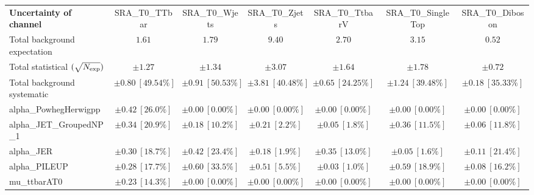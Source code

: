 
\begin{sidewaystable}
\begin{center}
\setlength{\tabcolsep}{0.0pc}
\begin{tabular*}{\textwidth}{@{\extracolsep{\fill}}lcccccc}
\noalign{\smallskip}\hline\noalign{\smallskip}
{\bf Uncertainty of channel}                                    & SRA\_T0\_TTbar            & SRA\_T0\_Wjets            & SRA\_T0\_Zjets            & SRA\_T0\_TtbarV            & SRA\_T0\_SingleTop            & SRA\_T0\_Diboson            \\
\noalign{\smallskip}\hline\noalign{\smallskip}
Total background expectation             &  $1.61$        &  $1.79$        &  $9.40$        &  $2.70$        &  $3.15$        &  $0.52$       \\
\noalign{\smallskip}\hline\noalign{\smallskip}
Total statistical $(\sqrt{N_{\rm exp}})$              & $\pm 1.27$        & $\pm 1.34$        & $\pm 3.07$        & $\pm 1.64$        & $\pm 1.78$        & $\pm 0.72$       \\
Total background systematic               & $\pm 0.80\ [49.54\%] $        & $\pm 0.91\ [50.53\%] $        & $\pm 3.81\ [40.48\%] $        & $\pm 0.65\ [24.25\%] $        & $\pm 1.24\ [39.48\%] $        & $\pm 0.18\ [35.33\%] $             \\
\noalign{\smallskip}\hline\noalign{\smallskip}
\noalign{\smallskip}\hline\noalign{\smallskip}
alpha\_PowhegHerwigpp         & $\pm 0.42\ [26.0\%] $          & $\pm 0.00\ [0.00\%] $          & $\pm 0.00\ [0.00\%] $          & $\pm 0.00\ [0.00\%] $          & $\pm 0.00\ [0.00\%] $          & $\pm 0.00\ [0.00\%] $       \\
alpha\_JET\_GroupedNP\_1         & $\pm 0.34\ [20.9\%] $          & $\pm 0.18\ [10.2\%] $          & $\pm 0.21\ [2.2\%] $          & $\pm 0.05\ [1.8\%] $          & $\pm 0.36\ [11.5\%] $          & $\pm 0.06\ [11.8\%] $       \\
alpha\_JER         & $\pm 0.30\ [18.7\%] $          & $\pm 0.42\ [23.4\%] $          & $\pm 0.18\ [1.9\%] $          & $\pm 0.35\ [13.0\%] $          & $\pm 0.05\ [1.6\%] $          & $\pm 0.11\ [21.4\%] $       \\
alpha\_PILEUP         & $\pm 0.28\ [17.7\%] $          & $\pm 0.60\ [33.5\%] $          & $\pm 0.51\ [5.5\%] $          & $\pm 0.03\ [1.0\%] $          & $\pm 0.59\ [18.9\%] $          & $\pm 0.08\ [16.2\%] $       \\
mu\_ttbarAT0         & $\pm 0.23\ [14.3\%] $          & $\pm 0.00\ [0.00\%] $          & $\pm 0.00\ [0.00\%] $          & $\pm 0.00\ [0.00\%] $          & $\pm 0.00\ [0.00\%] $          & $\pm 0.00\ [0.00\%] $       \\

\end{tabular*}
\end{center}
\end{sidewaystable}
